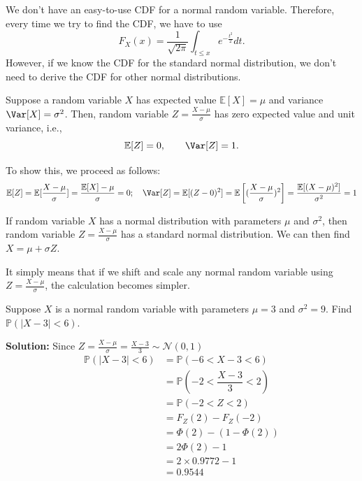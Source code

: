 We don't have an easy-to-use CDF for a normal random variable. Therefore, every time we try to find the CDF, we have to use
\[
    F_X(x) = \dfrac{1}{\sqrt{2\pi}} \int_{t \leq x} e^{-\frac{t^2}{2}}dt. 
\]
However, if we know the CDF for the standard normal distribution, we don't need to derive the CDF for other normal distributions.

Suppose a random variable \(X\) has expected value \(\mathbb{E}[X] = \mu\) and variance \(\Var[X] = \sigma^2\). Then, random variable \(Z = \frac{X - \mu}{\sigma}\) has zero expected value and unit variance, i.e.,
\[
    \mathbb{E}[Z] = 0, \quad\quad \Var[Z] = 1.
\]

To show this, we proceed as follows: 
\[
    \mathbb{E}[Z] = \mathbb{E}[\dfrac{X - \mu}{\sigma}] = \dfrac{\mathbb{E}[X] - \mu}{\sigma} = 0 ;\quad \Var[Z] = \mathbb{E}[(Z - 0)^2] = \mathbb{E}\left[(\dfrac{X - \mu}{\sigma})^2\right] = \dfrac{\mathbb{E}[(X - \mu)^2]}{\sigma^2} = 1
\]

If random variable \(X\) has a normal distribution with parameters \(\mu\) and \(\sigma^2\), then random variable \(Z = \frac{X - \mu}{\sigma}\) has a standard normal distribution. We can then find \(X = \mu + \sigma Z\). 

It simply means that if we shift and scale any normal random variable using \(Z = \frac{X - \mu}{\sigma}\), the calculation becomes simpler.

\begin{eg}
    Suppose \(X\) is a normal random variable with parameters \(\mu = 3\) and \(\sigma^2 = 9\). Find \(\mathbb{P}(\vert X - 3 \vert < 6)\).

    \textbf{Solution:} 
    Since \(Z = \frac{X - \mu}{\sigma} = \frac{X - 3}{3} \sim \mathcal{N}(0, 1)\) 
    \[
        \begin{aligned}
            \mathbb{P}(\vert X - 3 \vert < 6) &= \mathbb{P}(-6 <  X - 3 < 6) \\
            &= \mathbb{P}(-2 < \dfrac{X - 3}{3} < 2) \\
            &= \mathbb{P}(-2 < Z < 2) \\
            &= F_Z(2) - F_Z(-2) \\
            &= \varPhi (2) - (1 - \varPhi (2)) \\
            &= 2\varPhi (2) - 1 \\
            &= 2 \times 0.9772 - 1 \\
            &= 0.9544
        \end{aligned}
    \]
\end{eg}

